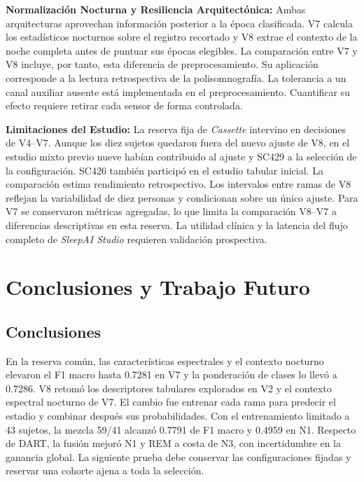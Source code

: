 \documentclass[conference]{IEEEtran}
\begin{document}
\textbf{Normalización Nocturna y Resiliencia Arquitectónica:}
Ambas arquitecturas aprovechan información posterior a la época clasificada. V7 calcula los estadísticos nocturnos sobre el registro recortado y V8 extrae el contexto de la noche completa antes de puntuar sus épocas elegibles. La comparación entre V7 y V8 incluye, por tanto, esta diferencia de preprocesamiento. Su aplicación corresponde a la lectura retrospectiva de la polisomnografía. La tolerancia a un canal auxiliar ausente está implementada en el preprocesamiento. Cuantificar su efecto requiere retirar cada sensor de forma controlada.

\textbf{Limitaciones del Estudio:}
La reserva fija de \textit{Cassette} intervino en decisiones de V4--V7. Aunque los diez sujetos quedaron fuera del nuevo ajuste de V8, en el estudio mixto previo nueve habían contribuido al ajuste y SC429 a la selección de la configuración. SC426 también participó en el estudio tabular inicial. La comparación estima rendimiento retrospectivo. Los intervalos entre ramas de V8 reflejan la variabilidad de diez personas y condicionan sobre un único ajuste. Para V7 se conservaron métricas agregadas, lo que limita la comparación V8--V7 a diferencias descriptivas en esta reserva. La utilidad clínica y la latencia del flujo completo de \textit{SleepAI Studio} requieren validación prospectiva.

\section{Conclusiones y Trabajo Futuro}
\subsection{Conclusiones}
En la reserva común, las características espectrales y el contexto nocturno elevaron el F1 macro hasta 0.7281 en V7 y la ponderación de clases lo llevó a 0.7286. V8 retomó los descriptores tabulares explorados en V2 y el contexto espectral nocturno de V7. El cambio fue entrenar cada rama para predecir el estadio y combinar después sus probabilidades. Con el entrenamiento limitado a 43 sujetos, la mezcla 59/41 alcanzó 0.7791 de F1 macro y 0.4959 en N1. Respecto de DART, la fusión mejoró N1 y REM a costa de N3, con incertidumbre en la ganancia global. La siguiente prueba debe conservar las configuraciones fijadas y reservar una cohorte ajena a toda la selección.
\end{document}
